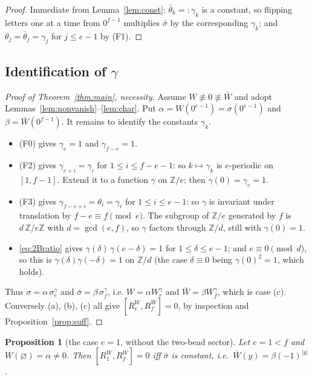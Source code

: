 \documentclass[11pt]{article}
\newtheorem{proposition}[theorem]{Proposition}
\theoremstyle{definition}
\theoremstyle{remark}
\newcommand{\Z}{\mathbb{Z}}
\begin{document}
\begin{proof}
Immediate from Lemma~\ref{lem:const}: $\bar\theta_k=:\gamma_k$ is a constant, so flipping
letters one at a time from $0^{f-1}$ multiplies $\bar\sigma$ by the corresponding
$\gamma_k$; and $\theta_j=\bar\theta_j=\gamma_j$ for $j\le e-1$ by (F1).
\end{proof}

\subsection{Identification of $\gamma$}

\begin{proof}[Proof of Theorem~\ref{thm:main}, necessity]
Assume $W\not\equiv0\not\equiv\bar W$ and adopt Lemmas~\ref{lem:nonvanish}--\ref{lem:char}.
Put $\alpha=W(0^{e-1})=\sigma(0^{e-1})$ and $\beta=\bar W(0^{f-1})$.  It remains to
identify the constants $\gamma_k$.
\begin{itemize}
\item (F0) gives $\gamma_e=1$ and $\gamma_{f-e}=1$.
\item (F2) gives $\gamma_{e+i}=\gamma_i$ for $1\le i\le f-e-1$: so $k\mapsto\gamma_k$ is
  $e$-periodic on $[1,f-1]$.  Extend it to a function $\gamma$ on $\Z/e$; then
  $\gamma(0)=\gamma_e=1$.
\item (F3) gives $\gamma_{f-e+i}=\theta_i=\gamma_i$ for $1\le i\le e-1$: so $\gamma$ is
  invariant under translation by $f-e\equiv f \pmod e$.  The subgroup of $\Z/e$
  generated by $f$ is $d\,\Z/e\Z$ with $d=\gcd(e,f)$, so $\gamma$ factors through
  $\Z/d$, still with $\gamma(0)=1$.
\item \eqref{eq:2Bratio} gives $\gamma(\delta)\,\gamma(e-\delta)=1$ for
  $1\le\delta\le e-1$; and $e\equiv0\pmod d$, so this is
  $\gamma(\delta)\gamma(-\delta)=1$ on $\Z/d$ (the case $\delta\equiv0$ being
  $\gamma(0)^2=1$, which holds).
\end{itemize}
Thus $\sigma=\alpha\,\sigma^{\gamma}_e$ and $\bar\sigma=\beta\,\sigma^{\gamma}_f$, i.e.
$W=\alpha W_e^{\gamma}$ and $\bar W=\beta W_f^{\gamma}$, which is case (c).  Conversely
(a), (b), (c) all give $[R_e^W,R_f^{\bar W}]=0$, by inspection and
Proposition~\ref{prop:suff}.
\end{proof}

\begin{proposition}[the case $e=1$, without the two-bead sector]\label{prop:e1}
Let $e=1<f$ and $W(\varnothing)=\alpha\ne0$.  Then $[R_1^{W},R_f^{\bar W}]=0$ iff
$\bar\sigma$ is constant, i.e.\ $\bar W(y)=\beta(-1)^{|y|}$.
\end{proposition}
\end{document}
